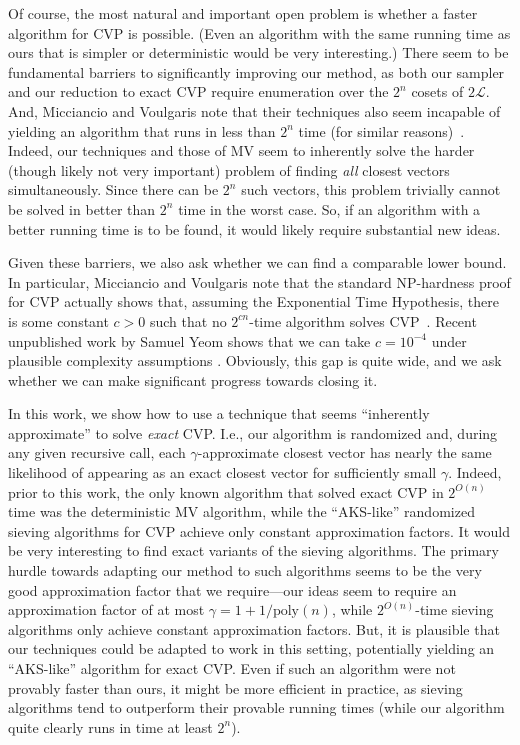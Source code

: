 \documentclass[11pt]{article}
\newcommand{\problem}[1]{\mbox{#1}\xspace}
\newcommand{\poly}{\mathrm{poly}}
\newcommand{\scarequotes}[1]{``#1''}
\newcommand{\lat}{\mathcal{L}}
\begin{document}
Of course, the most natural and important open problem is whether a faster algorithm for \problem{CVP} is possible. (Even an algorithm with the same running time as ours that is simpler or deterministic would be very interesting.) There seem to be fundamental barriers to significantly improving our method, as both our sampler and our reduction to exact \problem{CVP} require enumeration over the $2^n$ cosets of $2\lat$. And, Micciancio and Voulgaris note that their techniques also seem incapable of yielding an algorithm that runs in less than $2^n$ time (for similar reasons)~\cite{MV13}. Indeed, our techniques and those of MV seem to inherently solve the harder (though likely not very important) problem of finding \emph{all} closest vectors simultaneously. Since there can be $2^n$ such vectors, this problem trivially cannot be solved in better than $2^n$ time in the worst case. So, if an algorithm with a better running time is to be found, it would likely require substantial new ideas.

Given these barriers, we also ask whether we can find a comparable lower bound. In particular, Micciancio and Voulgaris note that the standard NP-hardness proof for CVP actually shows that, assuming the Exponential Time Hypothesis, there is some constant $c > 0$ such that no $2^{cn}$-time algorithm solves CVP~\cite{MV13}. Recent unpublished work by Samuel Yeom shows that we can take $c = 10^{-4}$ under plausible complexity assumptions \cite{priv:Vinod}. Obviously, this gap is quite wide, and we ask whether we can make significant progress towards closing it.

In this work, we show how to use a technique that seems \scarequotes{inherently approximate} to solve \emph{exact} \problem{CVP}. I.e., our algorithm is randomized and, during any given recursive call, each $\gamma$-approximate closest vector has nearly the same likelihood of appearing as an exact closest vector for sufficiently small $\gamma$. Indeed, prior to this work, the only known algorithm that solved exact \problem{CVP} in $2^{O(n)}$ time was the deterministic MV algorithm, while the \scarequotes{AKS-like} randomized sieving algorithms for \problem{CVP} achieve only constant approximation factors. It would be very interesting to find exact variants of the sieving algorithms. The primary hurdle towards adapting our method to such algorithms seems to be the very good approximation factor that we require---our ideas seem to require an approximation factor of at most $\gamma = 1+1/\poly(n)$, while $2^{O(n)}$-time sieving algorithms only achieve constant approximation factors. But, it is plausible that our techniques could be adapted to work in this setting, potentially yielding an \scarequotes{AKS-like} algorithm for exact CVP. Even if such an algorithm were not provably faster than ours, it might be more efficient in practice, as sieving algorithms tend to outperform their provable running times (while our algorithm quite clearly runs in time at least $2^n$).
\end{document}
